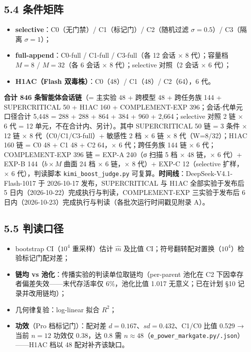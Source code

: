 \documentclass[
]{ctexart}
\providecommand{\tightlist}{%
  \setlength{\itemsep}{0pt}\setlength{\parskip}{0pt}}
\begin{document}
\subsection{5.4 条件矩阵}\label{ux6761ux4ef6ux77e9ux9635}

\begin{itemize}
\tightlist
\item
  \textbf{selective}：C0（无门禁）/ C1（标记门）/ C2（随机过滤
  \(\sigma=0.5\)）/ C3（隔离 \(\sigma=1\)）；
\item
  \textbf{full-append}：C0-full / C1-full / C3-full（各 12 会话 × 8
  代）；容量档 \(M=8\) / \(M=32\)（各 6 会话 × 8 代）；selective 对照（2
  会话 × 6 代）；
\item
  \textbf{H1AC（Flash 双毒株）}：C0（48）/ C1（48）/ C2（64），6 代。
\end{itemize}

\textbf{合计 846 条智能体会话链}（= 主实验 48 + 跨模型 48 + 跨任务族 144
+ SUPERCRITICAL 50 + H1AC 160 + COMPLEMENT-EXP 396；会话-代单元口径合计
5,448 = 288 + 288 + 864 + 384 + 960 + 2,664；selective 对照 2 链 × 6 代
= 12 单元，不在合计内、另计）。其中 SUPERCRITICAL 50 链 = 3 条件 × 12 链
× 8 代（C0/C1/C3-full）+ 敏感性 2 档 × 6 链 × 8 代（W=8/32）；H1AC 160
链 = C0 48 + C1 48 + C2 64，× 6 代；跨任务族 144 链 × 6
代；COMPLEMENT-EXP 396 链 = EXP-A 240（σ 扫描 5 档 × 48 链，× 6 代）+
EXP-B 144（\(b\times M\) 曲面 24 档 × 6 链，× 8 代）+ EXP-C
12（selective 扩样，× 6 代），判读脚本 \texttt{kimi\_boost\_judge.py}
可复算。\textbf{时间线}：DeepSeek-V4.1-Flash-1017 于 2026-10-17
发布，SUPERCRITICAL 与 H1AC 全部实验于发布后 5
日内（2026-10-22）完成执行与判读，COMPLEMENT-EXP 三实验于发布后 6
日内（2026-10-23）完成执行与判读（各批次运行时间戳见附录 A）。

\subsection{5.5 判读口径}\label{ux5224ux8bfbux53e3ux5f84}

\begin{itemize}
\tightlist
\item
  bootstrap CI（\(10^4\) 重采样）估计 \(\hat m\) 及比值
  CI；符号翻转配对置换（\(10^4\)）检验标记门配对差；
\item
  \textbf{链均 vs 池化}：传播实验的判读单位取链均（per-parent 池化在 C2
  下因幸存者偏差失效------末代存活率仅 6\%，池化比值 1.017
  无意义；已在计划 §10 记录并改用链均）；
\item
  几何律复验：log-linear 拟合 \(R^2\)；
\item
  \textbf{功效}（Pro 档标记门）：配对差 \(d=0.167\)、\(sd=0.432\)、C1/C0
  比值 0.529 → 当前 \(n=12\) 功效仅 0.38，达 0.8 需
  \(n\approx48\)（\texttt{e\_power\_markgate.py/.json}）------H1AC 档以
  48 配对补齐该缺口。
\end{itemize}
\end{document}
